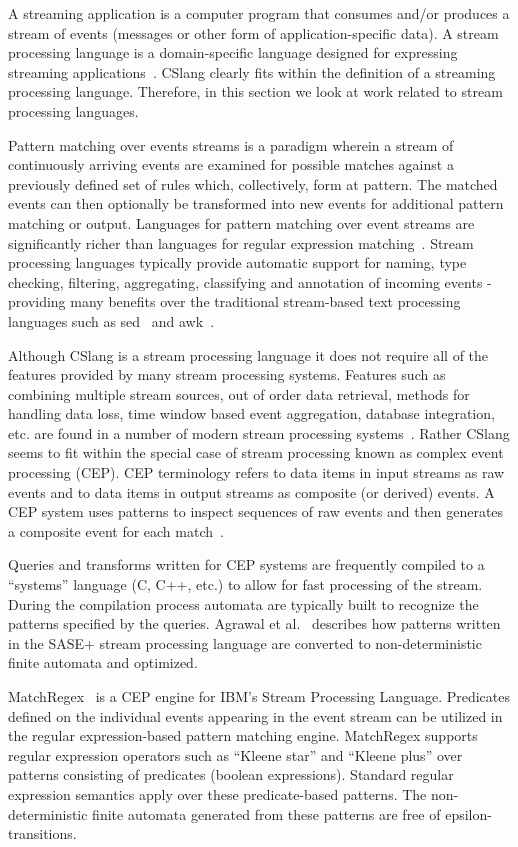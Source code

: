 A streaming application
is a computer program
that consumes and/or
produces
a stream of events (messages or other form of application-specific data).
A stream processing language is a domain-specific language
designed for expressing streaming applications~\cite{DBLP:journals/sigmod/HirzelBBVSV18}. CSlang clearly
fits within the definition of a streaming processing language.
Therefore, in this
section we look at work related to stream processing languages.

Pattern matching
over events streams is a paradigm
wherein a stream of continuously arriving events are examined for 
possible matches against a previously defined set of rules which, collectively, form at pattern.
The matched events can then optionally be transformed into new events for additional pattern matching or output.
Languages for pattern matching over event
streams are significantly richer than languages for regular expression
matching~\cite{DBLP:conf/sigmod/AgrawalDGI08}.
Stream processing languages typically provide automatic
support for naming, type checking, filtering, aggregating, classifying and
annotation of incoming events - providing many benefits over the traditional
stream-based text processing languages such as sed~\cite{Mcmahon1979sed} and
awk~\cite{DBLP:journals/spe/AhoKW79}.

Although CSlang is a stream processing language it does not
require all of the features provided by many stream processing systems. Features
such as combining multiple stream sources, out of order data retrieval, methods
for handling data loss, time window based event aggregation, database
integration, etc. are found in a number of modern stream processing
systems~\cite{DBLP:journals/csur/DayarathnaP18}.   Rather CSlang seems to fit within the special case of
stream processing known as complex event processing (CEP). CEP terminology refers
to data items in input streams as raw events and to data items in output streams
as composite (or derived) events. A CEP system uses patterns to inspect
sequences of raw events and then generates a composite event for each
match~\cite{DBLP:journals/ibmrd/HirzelAGJKKMNSSW13}.

Queries and transforms written for CEP systems are
frequently compiled to a “systems” language (C, C++, etc.) to allow for fast
processing of the stream. During the compilation process automata are typically
built to recognize the patterns specified by the queries. Agrawal et
al.~\cite{DBLP:conf/sigmod/AgrawalDGI08} describes how patterns written in the SASE+ stream
processing language are converted to non-deterministic finite automata and
optimized.

MatchRegex~\cite{DBLP:conf/debs/Hirzel12} is a CEP engine for IBM’s Stream Processing
Language. Predicates defined on the individual events appearing in the event
stream can be utilized in the regular expression-based pattern matching
engine. MatchRegex supports regular expression operators such as “Kleene star”
and “Kleene plus” over patterns consisting of predicates (boolean expressions).
Standard regular expression semantics apply over these predicate-based patterns.
The non-deterministic finite automata generated from these patterns are free of
epsilon-transitions.
